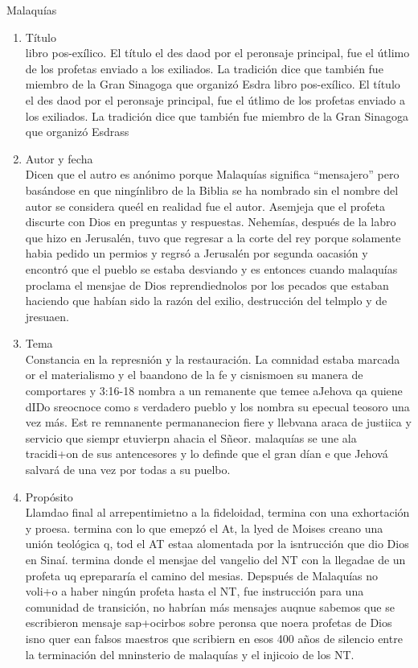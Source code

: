 \documentclass[12pt]{article}
\begin{document}
\begin{section}{Malaquías}
	\begin{enumerate}
		\item Título\\
			libro pos-exílico. El título el des daod por el peronsaje principal, fue el útlimo de los profetas enviado a los exiliados. La tradición dice que también fue miembro de la Gran Sinagoga que organizó Esdra
			libro pos-exílico. El título el des daod por el peronsaje principal, fue el útlimo de los profetas enviado a los exiliados. La tradición dice que también fue miembro de la Gran Sinagoga que organizó Esdrass
		\item Autor y fecha\\
			Dicen que el autro es anónimo porque Malaquías significa ``mensajero'' pero basándose en que ningínlibro de la Biblia se ha nombrado sin el nombre del autor se considera queél en realidad fue el autor. Asemjeja que el profeta discurte con Dios en preguntas y respuestas. Nehemías, después de la labro que hizo en Jerusalén, tuvo que regresar a la corte del rey porque solamente habia pedido un permios y regrsó a Jerusalén por segunda oacasión y encontró que el pueblo se estaba desviando y es entonces cuando malaquías proclama el mensjae de Dios reprendiednolos por los pecados que estaban haciendo que habían sido la razón del exilio, destrucción del telmplo y de jresuaen.
		\item Tema\\
			Constancia en la represnión y la restauración. La comnidad estaba marcada or el materialismo y el baandono de la fe y cisnismoen su manera de comportares y 3:16-18 nombra  a un remanente que temee aJehova qa quiene dIDo sreocnoce como s verdadero pueblo y los nombra su epecual teosoro una vez más. Est re remnanente permananecion fiere y llebvana araca de justiica y servicio que siempr etuvierpn ahacia el Sñeor. malaquías se une  ala tracidi+on de sus antencesores y lo definde que el gran dían e que Jehová salvará de una vez por todas a su puelbo.
		\item Propósito\\
			Llamdao final al arrepentimietno a la fideloidad, termina con una exhortación y proesa. termina con lo que emepzó el At, la lyed de Moises creano una unión teológica q, tod el AT estaa alomentada por la isntrucción que dio Dios en Sinaí. termina donde el mensjae del vangelio del NT con la llegadae de un profeta uq eprepararía el camino del mesias. Depspués de Malaquías no voli+o a haber ningún profeta hasta el NT, fue instrucción para una comunidad de transición, no habrían más mensajes auqnue sabemos que se escribieron mensaje sap+ocirbos sobre peronsa que noera profetas de Dios isno quer ean falsos maestros que scribiern en esos 400 años de silencio entre la terminación del mninsterio de malaquías y el injicoio de los NT.

\end{enumerate}
\end{section}
\end{document}
